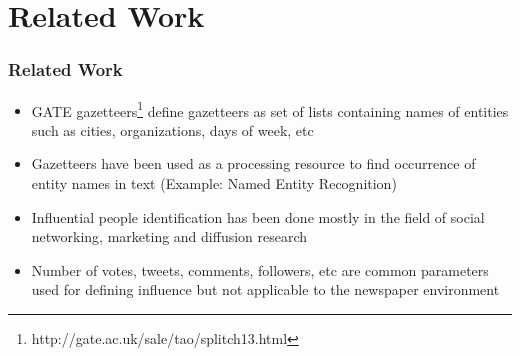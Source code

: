 \documentclass{beamer}
\begin{document}
\section{Related Work}
\begin{frame}
\frametitle{Related Work}
\begin{itemize}
\item
GATE gazetteers\footnote{http://gate.ac.uk/sale/tao/splitch13.html} define gazetteers as set of lists containing names of entities such as cities, organizations, days of week, etc
\item
Gazetteers have been used as a processing resource to find occurrence of entity names in text\cite{carlson2009learning}\cite{zhang2009novel} (Example: Named Entity Recognition)
\item
Influential people identification has been done mostly in the field of social networking, marketing and diffusion research\cite{cha2010measuring}\cite{agarwal2008identifying}
\item
 Number of votes, tweets, comments, followers, etc are common parameters used for defining influence but not applicable to the newspaper environment 
\end{itemize} 

\end{frame}

 
\end{document}
